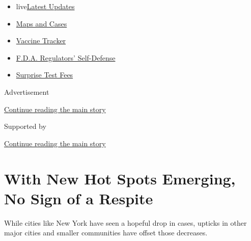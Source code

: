 \begin{itemize}
\tightlist
\item
  live\href{https://www.nytimes3xbfgragh.onion/2020/09/11/world/covid-19-coronavirus.html?name=styln-coronavirus-national\&region=TOP_BANNER\&block=storyline_menu_recirc\&action=click\&pgtype=Article\&impression_id=0ddc8941-f4bb-11ea-bb8e-792101acfed7\&variant=undefined}{Latest
  Updates}
\item
  \href{https://www.nytimes3xbfgragh.onion/interactive/2020/us/coronavirus-us-cases.html?name=styln-coronavirus-national\&region=TOP_BANNER\&block=storyline_menu_recirc\&action=click\&pgtype=Article\&impression_id=0ddc8942-f4bb-11ea-bb8e-792101acfed7\&variant=undefined}{Maps
  and Cases}
\item
  \href{https://www.nytimes3xbfgragh.onion/interactive/2020/science/coronavirus-vaccine-tracker.html?name=styln-coronavirus-national\&region=TOP_BANNER\&block=storyline_menu_recirc\&action=click\&pgtype=Article\&impression_id=0ddc8943-f4bb-11ea-bb8e-792101acfed7\&variant=undefined}{Vaccine
  Tracker}
\item
  \href{https://www.nytimes3xbfgragh.onion/2020/09/10/us/politics/fda-coronavirus-vaccine.html?name=styln-coronavirus-national\&region=TOP_BANNER\&block=storyline_menu_recirc\&action=click\&pgtype=Article\&impression_id=0ddcb050-f4bb-11ea-bb8e-792101acfed7\&variant=undefined}{F.D.A.
  Regulators' Self-Defense}
\item
  \href{https://www.nytimes3xbfgragh.onion/2020/09/09/upshot/coronavirus-surprise-test-fees.html?name=styln-coronavirus-national\&region=TOP_BANNER\&block=storyline_menu_recirc\&action=click\&pgtype=Article\&impression_id=0ddcb051-f4bb-11ea-bb8e-792101acfed7\&variant=undefined}{Surprise
  Test Fees}
\end{itemize}

Advertisement

\protect\hyperlink{after-top}{Continue reading the main story}

Supported by

\protect\hyperlink{after-sponsor}{Continue reading the main story}

\hypertarget{with-new-hot-spots-emerging-no-sign-of-a-respite}{%
\section{With New Hot Spots Emerging, No Sign of a
Respite}\label{with-new-hot-spots-emerging-no-sign-of-a-respite}}

While cities like New York have seen a hopeful drop in cases, upticks in
other major cities and smaller communities have offset those decreases.

